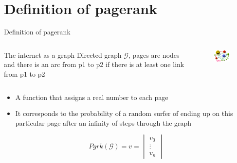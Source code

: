 \documentclass[10pt]{beamer}
\begin{document}
\section{Definition of pagerank}
\begin{frame}{Definition of pagerank}
  \begin{columns}
    \begin{column}{5cm}
      \begin{block}{The internet as a graph}
        Directed graph $\mathcal{G}$, pages are nodes and there is an arc from p1 to p2 if there is at least one link from p1 to p2
      \end{block}
    \end{column}
    \begin{column}{5cm}
      \begin{figure}[r]
        \includegraphics[width =4.5cm]{PageRank-hi-res.png}
      \end{figure}
    \end{column}
  \end{columns}
  \begin{definition}
    \begin{itemize}
      \item A function that assigns a real number to each page
      \item It corresponds to the probability of a random surfer of ending up on this particular page after an infinity of steps through the graph
    \end{itemize}
    $$Pgrk(\mathcal{G}) = v = \begin{vmatrix}v_0\\
      \vdots \\
    v_n\end{vmatrix} $$
  \end{definition}

\end{frame}
\end{document}
